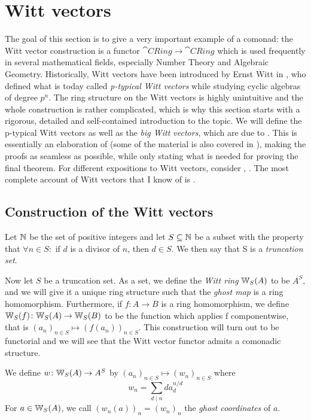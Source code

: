 \chapter{Witt vectors}
The goal of this section is to give a very important example of a comonad:
the Witt vector construction is a functor $\cat{CRing} \to \cat{CRing}$ which
is used frequently in several mathematical fields, especially Number Theory
and Algebraic Geometry. Historically, Witt vectors
have been introduced by Ernst Witt in \cite{witt}, who defined what is today called 
\textit{p-typical Witt vectors} while studying cyclic algebras of degree $p^n$. 
The ring structure on the Witt vectors is highly unintuitive and
the whole construction is rather complicated, which is why this section starts with a 
rigorous, detailed and self-contained introduction to the topic. We will define the p-typical Witt vectors
as well as the \textit{big Witt vectors}, which are due to \cite{cartier}. This is essentially an elaboration of
\cite{HES} (some of the material is also covered in \cite{HES2}), making the proofs as seamless as possible, while only stating what is needed
for proving the final theorem. For different expositions to Witt vectors, consider
\cite{rabinoff}, \cite{serre}. 
The most complete account of Witt vectors that I know of is \cite{hazewinkel}.

\section{Construction of the Witt vectors}

\begin{definition}
    Let $\mathbb{N}$ be the set of positive integers and let $S\subseteq
    \mathbb{N}$ be a subset with the property that $\forall n\in S:$
    if $d$ is a divisor of $n$, then $d\in S$.
    We then say that S is a \textit{truncation set}.
\end{definition}
Now let $S$ be a truncation set. As a set, we define the \textit{Witt ring} $\mathbb{W}_S(A)$ to be $A^S$,
and we will give it a unique ring structure such that the \textit{ghost map}
is a ring homomorphism. Furthermore, if $f \colon A \to B$ is a ring homomorphism,
we define $\mathbb{W}_S(f) \colon \mathbb{W}_S(A) \to \mathbb{W}_S(B)$ to be the function which applies
f componentwise, that is 
$(a_n)_{n \in S} \mapsto (f(a_n))_{n \in S}$.
This construction will turn out to be functorial and we will
see that the Witt vector functor admits a comonadic structure.

\begin{definition}
    We define $w \colon \mathbb{W}_S(A) \to A^S$
    by $(a_n)_{n \in S} \mapsto (w_n)_{n \in S}$ where 
    \[
        w_n = \sum_{d \mid n} d a_d^{n/d}
    \]
    For $a \in \mathbb{W}_S(A)$, we call $(w_n(a))_n = (w_n)_n$ the \textit{ghost coordinates} of $a$.
\end{definition}

